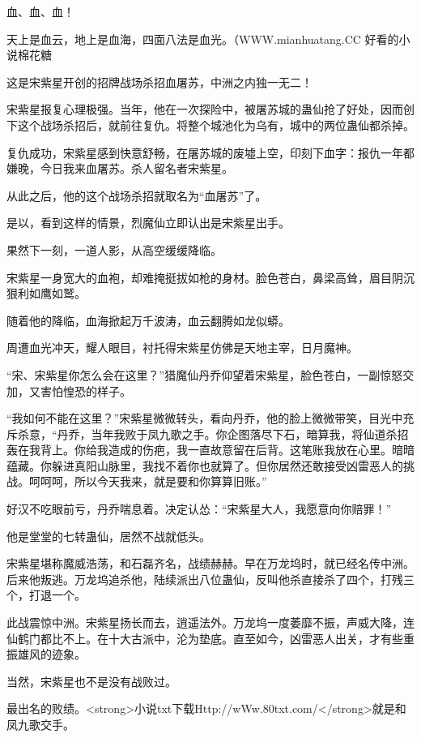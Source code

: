 
\begin{this_body}

血、血、血！

天上是血云，地上是血海，四面八法是血光。（WWW.mianhuatang.CC 好看的小说棉花糖

这是宋紫星开创的招牌战场杀招血屠苏，中洲之内独一无二！

宋紫星报复心理极强。当年，他在一次探险中，被屠苏城的蛊仙抢了好处，因而创下这个战场杀招后，就前往复仇。将整个城池化为乌有，城中的两位蛊仙都杀掉。

复仇成功，宋紫星感到快意舒畅，在屠苏城的废墟上空，印刻下血字：报仇一年都嫌晚，今日我来血屠苏。杀人留名者宋紫星。

从此之后，他的这个战场杀招就取名为“血屠苏”了。

是以，看到这样的情景，烈魔仙立即认出是宋紫星出手。

果然下一刻，一道人影，从高空缓缓降临。

宋紫星一身宽大的血袍，却难掩挺拔如枪的身材。脸色苍白，鼻梁高耸，眉目阴沉狠利如鹰如鹫。

随着他的降临，血海掀起万千波涛，血云翻腾如龙似蟒。

周遭血光冲天，耀人眼目，衬托得宋紫星仿佛是天地主宰，日月魔神。

“宋、宋紫星你怎么会在这里？”猎魔仙丹乔仰望着宋紫星，脸色苍白，一副惊怒交加，又害怕惶恐的样子。

“我如何不能在这里？”宋紫星微微转头，看向丹乔，他的脸上微微带笑，目光中充斥杀意，“丹乔，当年我败于凤九歌之手。你企图落尽下石，暗算我，将仙道杀招轰在我背上。你给我造成的伤疤，我一直故意留在后背。这笔账我放在心里。暗暗蕴藏。你躲进真阳山脉里，我找不着你也就算了。但你居然还敢接受凶雷恶人的挑战。呵呵呵，所以今天我来，就是要和你算算旧账。”

好汉不吃眼前亏，丹乔喘息着。决定认怂：“宋紫星大人，我愿意向你赔罪！”

他是堂堂的七转蛊仙，居然不战就低头。

宋紫星堪称魔威浩荡，和石磊齐名，战绩赫赫。早在万龙坞时，就已经名传中洲。后来他叛逃。万龙坞追杀他，陆续派出八位蛊仙，反叫他杀直接杀了四个，打残三个，打退一个。

此战震惊中洲。宋紫星扬长而去，逍遥法外。万龙坞一度萎靡不振，声威大降，连仙鹤门都比不上。在十大古派中，沦为垫底。直至如今，凶雷恶人出关，才有些重振雄风的迹象。

当然，宋紫星也不是没有战败过。

最出名的败绩。<strong>小说txt下载Http://wWw.80txt.com/</strong>就是和凤九歌交手。


\end{this_body}

